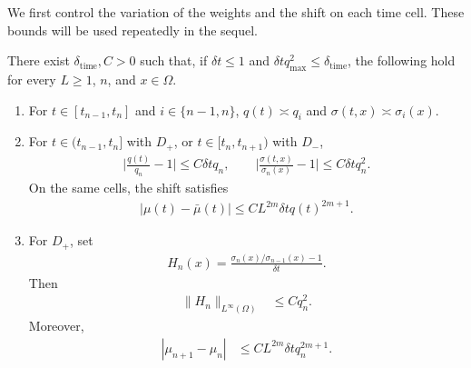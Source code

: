 \documentclass[print,wide,eng]{draft}
\begin{document}
We first control the variation of the weights and the shift on each time cell. These bounds will be used repeatedly in the sequel.
%
\begin{lemma}\label{lem:cell}
There exist $\delta_{\mathrm{time}},C>0$ such that, if ${\delta t}\le1$ and ${\delta t}q_{\max}^2\le\delta_{\mathrm{time}}$, the following hold for every $L\geq1$, $n$, and $x\in\Omega$.
\begin{enumerate}[label=(\roman*)]
\item For $t\in[t_{n-1},t_n]$ and $i\in\{n-1,n\}$,
$
q(t)\asymp q_i$ and $\sigma(t,x)\asymp\sigma_i(x)$.
\item  For $t\in(t_{n-1},t_n]$ with $D_+$, or $t\in[t_n,t_{n+1})$ with $D_-$,
\begin{align}\label{eq:cellbounds}
\biggl|\frac{q(t)}{q_n}-1\biggr|\le C{\delta t}q_n,
\qquad \biggl|\frac{\sigma(t,x)}{\sigma_n(x)}-1\biggr|\le C{\delta t}q_n^2.
\end{align}
On the same cells, the shift satisfies
\begin{align}\label{eq:cell-shift-bound}
|\mu(t)-\bar\mu(t)|\le CL^{2m}{\delta t}q(t)^{2m+1}.
\end{align}
\item For $D_+$, set\vspace{-3mm}
\begin{align*}
H_n(x)=\frac{\sigma_n(x)/\sigma_{n-1}(x)-1}{{\delta t}}.
\end{align*}
Then\vspace{-2mm}
\begin{align}
\|H_n\|_{L^\infty(\Omega)}
&\leq Cq_n^2.\label{eq:weight-time-quotient}
\end{align}
Moreover,\vspace{-2mm}
\begin{align}
|\mu_{n+1}-\mu_n|&\leq CL^{2m}{\delta t}q_n^{2m+1}.\label{eq:shift-time-increment}
\end{align}
\end{enumerate}
\end{lemma}
%
\end{document}
